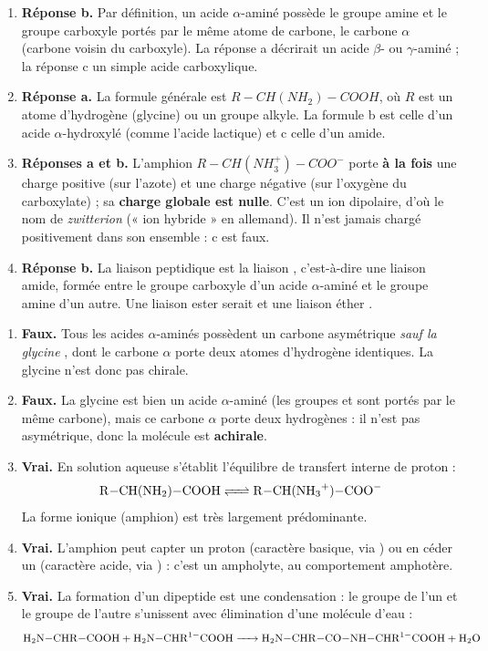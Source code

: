 \documentclass[11pt]{article}
\newcommand{\cle}[1]{{\popxbold\color{popdark}#1}}
\begin{document}
\begin{corrige}
\begin{enumerate}
\item \textbf{Réponse b.} Par définition, un acide $\alpha$-aminé possède le groupe amine  et le groupe carboxyle  portés par le \cle{même atome de carbone}, le carbone $\alpha$ (carbone voisin du carboxyle). La réponse a décrirait un acide $\beta$- ou $\gamma$-aminé ; la réponse c un simple acide carboxylique.
\item \textbf{Réponse a.} La formule générale est $R-CH(NH_2)-COOH$, où $R$ est un atome d'hydrogène (glycine) ou un groupe alkyle. La formule b est celle d'un acide $\alpha$-hydroxylé (comme l'acide lactique) et c celle d'un amide.
\item \textbf{Réponses a et b.} L'amphion $R-CH(NH_3^+)-COO^-$ porte \textbf{à la fois} une charge positive (sur l'azote) et une charge négative (sur l'oxygène du carboxylate) ; sa \textbf{charge globale est nulle}. C'est un ion dipolaire, d'où le nom de \emph{zwitterion} (« ion hybride » en allemand). Il n'est jamais chargé positivement dans son ensemble : c est faux.
\item \textbf{Réponse b.} La liaison peptidique est la liaison , c'est-à-dire une liaison \cle{amide}, formée entre le groupe carboxyle d'un acide $\alpha$-aminé et le groupe amine d'un autre. Une liaison ester serait  et une liaison éther .
\end{enumerate}
\end{corrige}

\begin{corrige}
\begin{enumerate}
\item \textbf{Faux.} Tous les acides $\alpha$-aminés possèdent un carbone asymétrique \emph{sauf la glycine} , dont le carbone $\alpha$ porte deux atomes d'hydrogène identiques. La glycine n'est donc pas chirale.
\item \textbf{Faux.} La glycine est bien un acide $\alpha$-aminé (les groupes  et  sont portés par le même carbone), mais ce carbone $\alpha$ porte deux hydrogènes : il n'est pas asymétrique, donc la molécule est \textbf{achirale}.
\item \textbf{Vrai.} En solution aqueuse s'établit l'équilibre de transfert interne de proton :
\[ \ce{R-CH(NH2)-COOH <=> R-CH(NH3+)-COO-} \]
La forme ionique (amphion) est très largement prédominante.
\item \textbf{Vrai.} L'amphion peut capter un proton (caractère basique, via ) ou en céder un (caractère acide, via ) : c'est un \cle{ampholyte}, au comportement \cle{amphotère}.
\item \textbf{Vrai.} La formation d'un dipeptide est une \cle{condensation} : le groupe  de l'un et le groupe  de l'autre s'unissent avec élimination d'une molécule d'eau :
\[ \ce{H2N-CHR-COOH + H2N-CHR^1-COOH -> H2N-CHR-CO-NH-CHR^1-COOH + H2O} \]
\end{enumerate}
\end{corrige}
\end{document}
